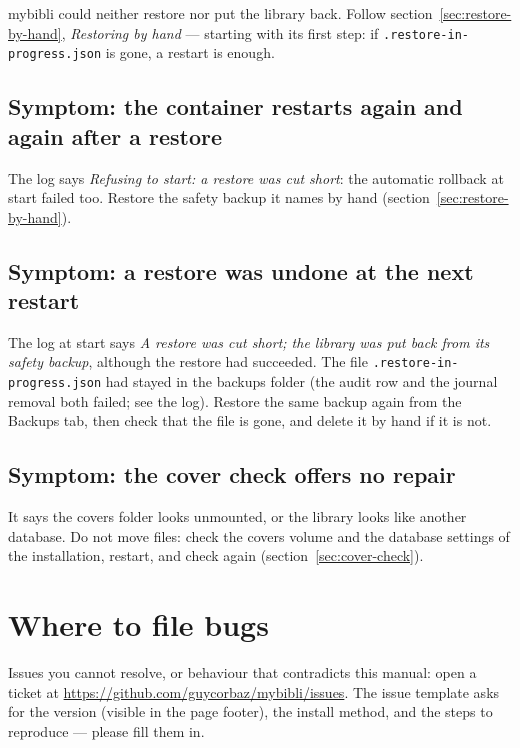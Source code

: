 mybibli could neither restore nor put the library back. Follow
section~\ref{sec:restore-by-hand}, \emph{Restoring by hand} --- starting
with its first step: if \texttt{.restore-\allowbreak in-\allowbreak progress.json} is gone, a
restart is enough.

\subsection*{Symptom: the container restarts again and again after a restore}

The log says \emph{Refusing to start: a restore was cut short}: the
automatic rollback at start failed too. Restore the safety backup it
names by hand (section~\ref{sec:restore-by-hand}).

\subsection*{Symptom: a restore was undone at the next restart}

The log at start says \emph{A restore was cut short; the library was put
back from its safety backup}, although the restore had succeeded. The
file \texttt{.restore-\allowbreak in-\allowbreak progress.json} had stayed in the backups folder
(the audit row and the journal removal both failed; see the log).
Restore the same backup again from the Backups tab, then check that the
file is gone, and delete it by hand if it is not.

\subsection*{Symptom: the cover check offers no repair}

It says the covers folder looks unmounted, or the library looks like
another database. Do not move files: check the covers volume and the
database settings of the installation, restart, and check again
(section~\ref{sec:cover-check}).

\section{Where to file bugs}

Issues you cannot resolve, or behaviour that contradicts this
manual: open a ticket at
\url{https://github.com/guycorbaz/mybibli/issues}. The issue
template asks for the version (visible in the page footer), the
install method, and the steps to reproduce — please fill them in.
